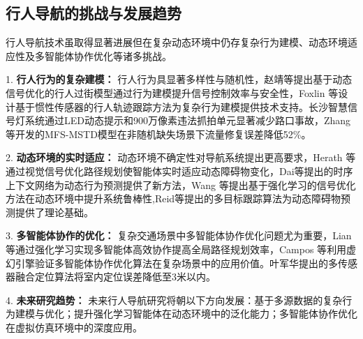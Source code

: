 \subsection{行人导航的挑战与发展趋势}

行人导航技术虽取得显著进展但在复杂动态环境中仍存复杂行为建模、动态环境适应性及多智能体协作优化等诸多挑战。

1. \textbf{行人行为的复杂建模：} 行人行为具显著多样性与随机性，赵靖等\cite{zhao2014crossing}提出基于动态信号优化的行人过街模型通过行为建模提升信号控制效率与安全性，Foxlin 等\cite{foxlin2005tracking}设计基于惯性传感器的行人轨迹跟踪方法为复杂行为建模提供技术支持。长沙智慧信号灯系统\cite{changsha2021}通过LED动态提示和900万像素违法抓拍单元显著减少路口事故，Zhang等\cite{zhang2025traffic}开发的MFS-MSTD模型在非随机缺失场景下流量修复误差降低52\%。

2. \textbf{动态环境的实时适应：} 动态环境不确定性对导航系统提出更高要求，Herath 等\cite{herath2020ronin}通过视觉信号优化路径规划使智能体实时适应动态障碍物变化，Dai等\cite{dai2017temporalcontext}提出的时序上下文网络为动态行为预测提供了新方法，Wang 等\cite{wang2013densetrajectory}提出基于强化学习的信号优化方法在动态环境中提升系统鲁棒性,Reid等\cite{reid1980tracking}提出的多目标跟踪算法为动态障碍物预测提供了理论基础。

3. \textbf{多智能体协作的优化：} 复杂交通场景中多智能体协作优化问题尤为重要，Lian 等\cite{lian2023inverseql}通过强化学习实现多智能体高效协作提高全局路径规划效率，Campos 等\cite{campos2021orbslam3}利用虚幻引擎验证多智能体协作优化算法在复杂场景中的应用价值。叶军华\cite{ye2023fusion}提出的多传感器融合定位算法将室内定位误差降低至3米以内。

4. \textbf{未来研究趋势：} 未来行人导航研究将朝以下方向发展：基于多源数据的复杂行为建模与优化；提升强化学习智能体在动态环境中的泛化能力；多智能体协作优化在虚拟仿真环境中的深度应用。
